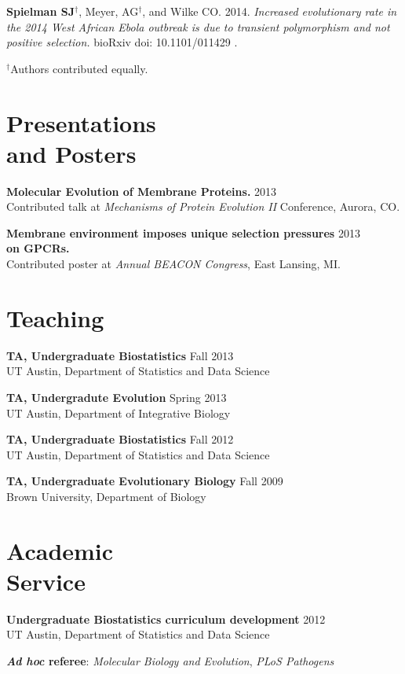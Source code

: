 \documentclass[line, margin]{res}
\begin{document}
\begin{resume}
\textbf{Spielman SJ}$^\dagger$, Meyer, AG$^\dagger$, and Wilke CO. 2014. \emph{Increased evolutionary rate in the 2014 West African Ebola outbreak is due to transient polymorphism and not positive selection.} bioRxiv doi: 10.1101/011429 .

$^\dagger$Authors contributed equally. \\

\vspace{0.75cm}

\section{Presentations \\ and Posters}

\textbf{Molecular Evolution of Membrane Proteins.} \hfill 2013 \\ Contributed talk at \emph{Mechanisms of Protein Evolution II} Conference, Aurora, CO.

\textbf{Membrane environment imposes unique selection pressures} \hfill 2013 \\ \textbf{on GPCRs.} \\ Contributed poster at \emph{Annual BEACON Congress}, East Lansing, MI.

\vspace{0.75cm}


\section{Teaching} 


\textbf{TA, Undergraduate Biostatistics} \hfill Fall 2013 \\ UT Austin, Department of Statistics and Data Science

\textbf{TA, Undergradute Evolution} \hfill Spring 2013 \\ UT Austin, Department of Integrative Biology

\textbf{TA, Undergraduate Biostatistics} \hfill Fall 2012 \\ UT Austin, Department of 
Statistics and Data Science

\textbf{TA, Undergraduate Evolutionary Biology} \hfill Fall 2009 \\ Brown University, Department of Biology 

\vspace{0.75cm}

\section{Academic \\ Service} 

\textbf{Undergraduate Biostatistics curriculum development} \hfill 2012 \\UT Austin, Department of Statistics and Data Science

\textbf{\textit{Ad hoc} referee}: \textit{Molecular Biology and Evolution}, \textit{PLoS Pathogens} 

\end{resume}
\end{document}
